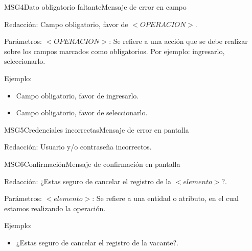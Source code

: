    
\begin{mensaje}{MSG4}{Dato obligatorio faltante}{Mensaje de error en campo}
	\item[Redacción:] Campo obligatorio, favor de $<OPERACION>$.
    \item[Parámetros:] $<OPERACION>$: Se refiere a una acción que se debe realizar sobre los campos marcados como obligatorios. Por ejemplo: ingresarlo, seleccionarlo.
    

    \item[Ejemplo:]\begin{itemize}
        
        \item Campo obligatorio, favor de ingresarlo.  
        \item Campo obligatorio, favor de seleccionarlo.
    \end{itemize} 
\end{mensaje}


\begin{mensaje}{MSG5}{Credenciales incorrectas}{Mensaje de error en pantalla}
	\item[Redacción:] Usuario y/o contraseña incorrectos.
\end{mensaje}


\begin{mensaje}{MSG6}{Confirmación}{Mensaje de confirmación en pantalla}
	\item[Redacción:] ¿Estas seguro de cancelar el registro  de la $<elemento>$?.
    \item[Parámetros:] $<elemento>$: Se refiere a una entidad o atributo, en el cual estamos realizando la operación.
    \item[Ejemplo:]\begin{itemize}
        
        \item ¿Estas seguro de cancelar el registro  de la vacante?.  
    \end{itemize} 
    
\end{mensaje}


